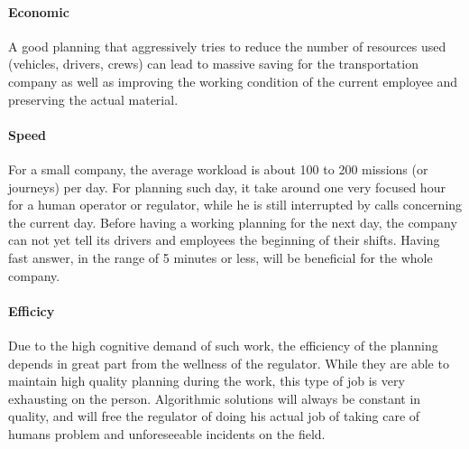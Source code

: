 \documentclass[12pt]{memoir}
\begin{document}
\paragraph{Economic} %
\label{par:Economic}
A good planning that aggressively tries to reduce the number of resources used
(vehicles, drivers, crews) can lead to massive saving for the transportation company
as well as improving the working condition of the current employee and preserving
the actual material.
\paragraph{Speed} %
\label{par:Speed}
For a small company, the average workload is about 100 to 200 missions (or journeys)
per day. For planning such day, it take around one very focused hour for a human
operator or regulator, while he is still interrupted by calls concerning the current
day. Before having a working planning for the next day, the company can not yet
tell its drivers and employees the beginning of their shifts. Having fast answer,
in the range of 5 minutes or less, will be beneficial for the whole company.
\paragraph{Efficicy} %
\label{par:Efficicy}
Due to the high cognitive demand of such work, the efficiency of the planning depends
in great part from the wellness of the regulator. While they are able to maintain
high quality planning during the work, this type of job is very exhausting on
the person. Algorithmic solutions will always be constant in quality, and will
free the regulator of doing his actual job of taking care of humans problem and
unforeseeable incidents on the field.

\end{document}
